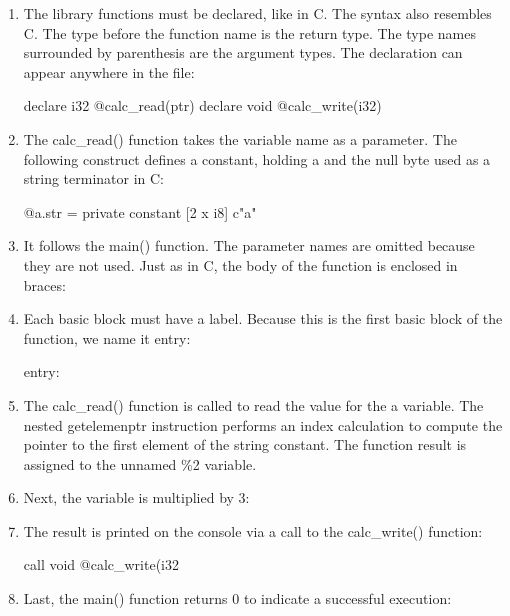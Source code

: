 \begin{enumerate}
\item
The library functions must be declared, like in C. The syntax also resembles C. The type before the function name is the return type.   The type names surrounded by parenthesis are the argument types. The declaration can appear anywhere in the file:

\begin{cpp}
declare i32 @calc_read(ptr)
declare void @calc_write(i32)
\end{cpp}

\item
The calc\_read() function takes the variable name as a parameter. The following construct defines a constant, holding a and the null byte used as a string terminator in C:

\begin{cpp}
@a.str = private constant [2 x i8] c"a"
\end{cpp}

\item
It follows the main() function. The parameter names are omitted because they are not used. Just as in C, the body of the function is enclosed in braces:

\begin{cpp}
define i32 @main(i32, ptr) {
\end{cpp}

\item
Each basic block must have a label. Because this is the first basic block of the function, we name it entry:

\begin{cpp}
entry:
\end{cpp}

\item
The calc\_read() function is called to read the value for the a variable. The nested getelemenptr instruction performs an index calculation to compute the pointer to the first element of the string constant. The function result is assigned to the unnamed \%2 variable.

\begin{cpp}
\end{cpp}

\item
Next, the variable is multiplied by 3:

\begin{cpp}
\end{cpp}

\item
The result is printed on the console via a call to the calc\_write() function:

\begin{cpp}
    call void @calc_write(i32 %
\end{cpp}

\item
Last, the main() function returns 0 to indicate a successful execution:

\begin{cpp}
    ret i32 0
}
\end{cpp}

\end{enumerate}

